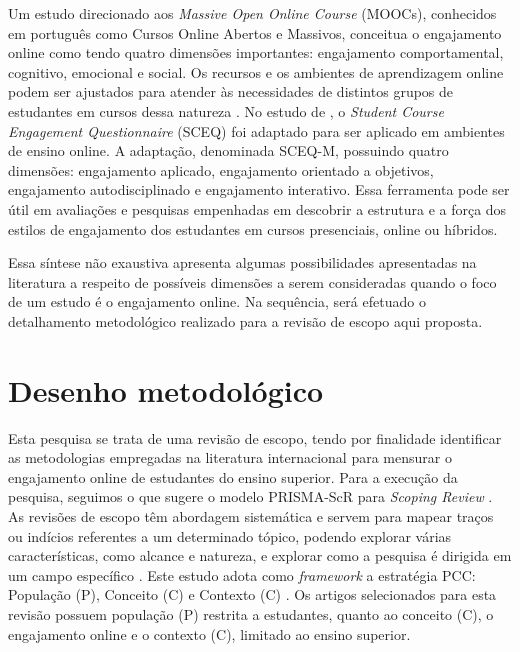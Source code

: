 \documentclass[portuguese]{textolivre}
\begin{document}
Um estudo direcionado aos \emph{Massive Open Online Course} (MOOCs), conhecidos em português como Cursos Online Abertos e Massivos, conceitua o engajamento online como tendo quatro dimensões importantes: engajamento comportamental, cognitivo, emocional e social. Os recursos e os ambientes de aprendizagem online podem ser ajustados para atender às necessidades de distintos grupos de estudantes em cursos dessa natureza \cite{deng2020}. No estudo de \textcite{nasir2020}, o \emph{Student Course Engagement Questionnaire} (SCEQ) foi adaptado para ser aplicado em ambientes de ensino online. A adaptação, denominada SCEQ-M, possuindo quatro dimensões: engajamento aplicado, engajamento orientado a objetivos, engajamento autodisciplinado e engajamento interativo. Essa ferramenta pode ser útil em avaliações e pesquisas empenhadas em descobrir a estrutura e a força dos estilos de engajamento dos estudantes em cursos presenciais, online ou híbridos.

Essa síntese não exaustiva apresenta algumas possibilidades apresentadas na literatura a respeito de possíveis dimensões a serem consideradas quando o foco de um estudo é o engajamento online. Na sequência, será efetuado o detalhamento metodológico realizado para a revisão de escopo aqui proposta.

\section{Desenho metodológico}
Esta pesquisa se trata de uma revisão de escopo, tendo por finalidade identificar as metodologias empregadas na literatura internacional para mensurar o engajamento online de estudantes do ensino superior. Para a execução da pesquisa, seguimos o que sugere o modelo PRISMA-ScR para \emph{Scoping Review} \cite{tricco2018}. As revisões de escopo têm abordagem sistemática e servem para mapear traços ou indícios referentes a um determinado tópico, podendo explorar várias características, como alcance e natureza, e explorar como a pesquisa é dirigida em um campo específico \cite{tricco2018, peters2020}. Este estudo adota como \emph{framework} a estratégia PCC: População (P), Conceito (C) e Contexto (C) \cite{peters2020}. Os artigos selecionados para esta revisão possuem população (P) restrita a estudantes, quanto ao conceito (C), o engajamento online e o contexto (C), limitado ao ensino superior.
\end{document}
